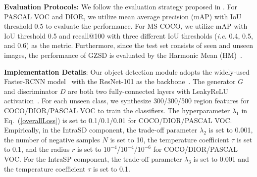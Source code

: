 \documentclass[10pt,twocolumn,letterpaper]{article}
\begin{document}
\textbf{Evaluation Protocols:} We follow the evaluation strategy proposed in \cite{bansal2018zero, Demirel2018ZeroShotOD}. For PASCAL VOC and DIOR, we utilize mean average precision (mAP) with IoU threshold 0.5 to evaluate the performance. For MS COCO, we utilize mAP with IoU threshold 0.5 and recall@100 with three different IoU thresholds (\emph{i.e.} 0.4, 0.5, and 0.6) as the metric. Furthermore, since the test set consists of seen and unseen images, the performance of GZSD is evaluated by the Harmonic Mean (HM)~\cite{han2021contrastive}.

\textbf{Implementation Details}: Our object detection module adopts the widely-used Faster-RCNN model~\cite{ren2016faster} with the ResNet-101 as the backbone~\cite{he2016deep}. The generator $G$ and discriminator $D$ are both two fully-connected layers with LeakyReLU activation~\cite{maas2013rectifier}. For each unseen class, we synthesize 300/300/500 region features for COCO/DIOR/PASCAL VOC to train the classifiers. The hyperparameter $\lambda_1$ in Eq.~(\ref{overallLoss}) is set to 0.1/0.1/0.01 for COCO/DIOR/PASCAL VOC. Empirically, in the IntraSD component, the trade-off parameter $\lambda_2$ is set to 0.001, the number of negative samples $N$ is set to 10, the temperature coefficient $\tau$ is set to 0.1, and the radius $r$ is set to $10^{-4}$/$10^{-4}$/$10^{-6}$ for COCO/DIOR/PASCAL VOC. For the IntraSP component, the trade-off parameter $\lambda_3$ is set to 0.001 and the temperature coefficient $\tau$ is set to 0.1. 
\end{document}
